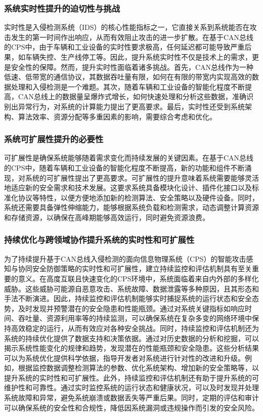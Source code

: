 \subsubsection{系统实时性提升的迫切性与挑战}

实时性是入侵检测系统（IDS）的核心性能指标之一，它直接关系到系统能否在攻击发生的第一时间作出响应，从而有效阻止攻击的进一步扩散。在基于CAN总线的CPS中，由于车辆和工业设备的实时性要求极高，任何延迟都可能导致严重后果，如车辆失控、生产线停工等。因此，提升系统实时性不仅是技术上的需求，更是安全性的保障。然而，提升实时性面临着诸多挑战。首先，CAN总线作为一种低速、低带宽的通信协议，其数据吞吐量有限，如何在有限的带宽内实现高效的数据处理和入侵检测是一个难题。其次，随着车辆和工业设备的智能化程度不断提高，CAN总线上的数据量呈爆炸式增长，如何快速处理和分析这些数据，准确识别出异常行为，对系统的计算能力提出了更高要求。最后，实时性还受到系统架构、算法效率、资源分配等多重因素的影响，需要综合考虑和优化。

\subsubsection{系统可扩展性提升的必要性}

可扩展性是确保系统能够随着需求变化而持续发展的关键因素。在基于CAN总线的CPS中，随着车辆和工业设备的智能化程度不断提高，新的功能和组件不断涌现，对系统的可扩展性提出了更高要求。可扩展性的提升意味着系统需要能够灵活地适应新的安全需求和技术发展。这要求系统具备模块化设计、插件化接口以及标准化协议等特性，以便方便地添加新的检测算法、安全策略以及硬件设备。同时，系统还需要具备弹性伸缩能力，能够根据系统负载和检测需求，动态调整计算资源和存储资源，以确保在高峰期能够高效运行，同时避免资源浪费。

\subsubsection{持续优化与跨领域协作提升系统的实时性和可扩展性}

为了持续提升基于CAN总线入侵检测的面向信息物理系统（CPS）的智能攻击感知与协同安全防御策略的实时性和可扩展性，建立持续监控和评估机制具有至关重要的意义。在高度互联且快速变化的CPS环境中，系统面临着来自内外部的多样化威胁。这些威胁可能源自恶意攻击、系统故障、数据泄露等多种原因，且其形态和手法不断演进。因此，持续监控和评估机制能够实时捕捉系统的运行状态和安全态势，及时发现并预警潜在的安全隐患和性能瓶颈。通过对系统关键指标如响应时间、吞吐量、资源利用率等的持续监测，可以确保系统在复杂多变的网络环境中保持高效稳定的运行，从而有效应对各种安全挑战。同时，持续监控和评估机制还为系统的持续优化提供了数据支持和决策依据。通过对历史数据的分析和挖掘，可以揭示系统性能变化的规律和趋势，发现潜在的性能瓶颈和安全隐患。这些分析结果可以为系统优化提供科学依据，指导开发者对系统进行针对性的改进和升级。例如，根据监控数据调整检测算法的参数、优化系统架构、增加新的安全策略等，以提升系统的实时性和可扩展性。此外，持续监控和评估机制还有助于提升系统的可维护性和可靠性。通过实时监控系统的运行状态和健康状况，可以及时发现并处理系统故障和异常，避免系统崩溃或数据丢失等严重后果。同时，定期的评估和审计可以确保系统的安全性和合规性，降低因系统漏洞或违规操作而引发的安全风险。

